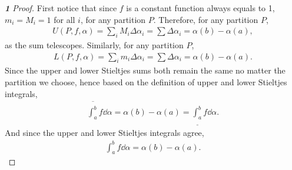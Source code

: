 \documentclass[12pt]{article}
\newenvironment{fproof}[1][]
  {\begin{proof}[\ifx\relax#1\relax\else\textbf{\large #1} Proof\fi]}
  {\end{proof}}
\newcommand{\upint}[2]{\overline{\int_{#1}^{#2}}}
\newcommand{\loint}[2]{\underline{\int_{#1}^{#2}}}
\begin{document}
\begin{fproof}[1]
  First notice that since \(f\) is a constant function always equals to 1, \(m_i = M_i = 1\) for all \(i\), for any partition \(P\).
  Therefore, for any partition \(P\),
  \begin{align*}
    U(P,f, \alpha) = \sum_i M_i \Delta \alpha_i = \sum \Delta \alpha_i = \alpha(b) - \alpha(a),
  \end{align*}
  as the sum telescopes.
  Similarly, for any partition \(P\),
  \begin{align*}
    L(P,f, \alpha) = \sum_i m_i \Delta \alpha_i = \sum \Delta \alpha_i = \alpha(b) - \alpha(a).
  \end{align*}
  Since the upper and lower Stieltjes sums both remain the same no matter the partition we choose, hence based on the definition of upper and lower Stieltjes integrals,
  \begin{align*}
    \upint{a}{b} f \dd \alpha = \alpha(b) - \alpha(a) = \loint{a}{b} f \dd \alpha.
  \end{align*} 
  And since the upper and lower Stieltjes integrals agree, 
  \begin{align*}
    \int_{a}^{b} f \dd \alpha = \alpha(b) - \alpha(a).
  \end{align*}
\end{fproof}

\newpage
\end{document}
